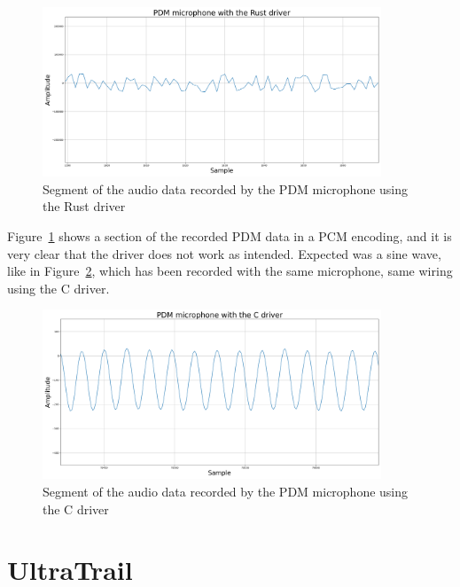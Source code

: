 \begin{figure}[H]
    \centering
    \includegraphics[width=0.9\textwidth]{figures/pdm/pdm_rust.png}
    \caption[Segment of the audio data recorded by the PDM microphone using the Rust driver]{Segment of the audio data recorded by the PDM microphone using the Rust driver}
    \label{fig:pdm_rust}
\end{figure}

Figure~\ref{fig:pdm_rust} shows a section of the recorded PDM data in a PCM encoding, and it is very clear that the driver does not work as intended.
Expected was a sine wave, like in Figure~\ref{fig:pdm_c}, which has been recorded with the same microphone, same wiring using the C driver.

\begin{figure}[H]
    \centering
    \includegraphics[width=0.9\textwidth]{figures/pdm/pdm_c.png}
    \caption[Segment of the audio data recorded by the PDM microphone using the C driver]{Segment of the audio data recorded by the PDM microphone using the C driver}
    \label{fig:pdm_c}
\end{figure}

\newpage

\section{UltraTrail}

